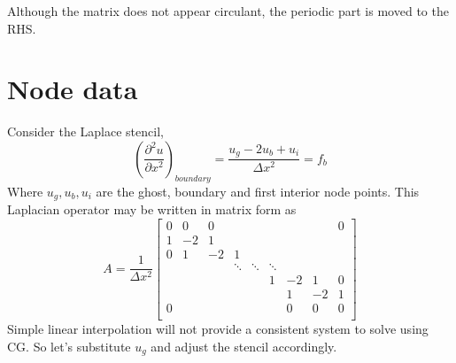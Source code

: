 \documentclass[landscape]{article}
\begin{document}
Although the matrix does not appear circulant, the periodic part is moved to the RHS.

\newpage
\section{Node data}
Consider the Laplace stencil,
\begin{equation}
   \left(\frac{\partial^2 u}{\partial x^2}\right)_{boundary} =
   \frac{u_g - 2 u_b + u_i}{\Delta x^2} = f_b
\end{equation}
Where $u_g,u_b,u_i$ are the ghost, boundary and first interior node points. This Laplacian operator may be written in matrix form as
\[ A = \frac{1}{\Delta x^2} \left[\begin{array}{ccccccccc}
0  & 0     & 0         &           &           &           &           &         &  0 \\
1  & -2    & 1         &           &           &           &           &         &    \\
0  & 1     & -2        & 1         &           &           &           &         &    \\
   &       &           & \ddots    & \ddots    & \ddots    &           &         &    \\
   &       &           &           &           & 1         & -2        & 1       &  0 \\
   &       &           &           &           &           &  1        & -2      &  1 \\
0  &       &           &           &           &           &  0        & 0       &  0 \\
\end{array} \right]
\]
Simple linear interpolation will not provide a consistent system to solve using CG. So let's substitute $u_g$ and adjust the stencil accordingly.
\end{document}

